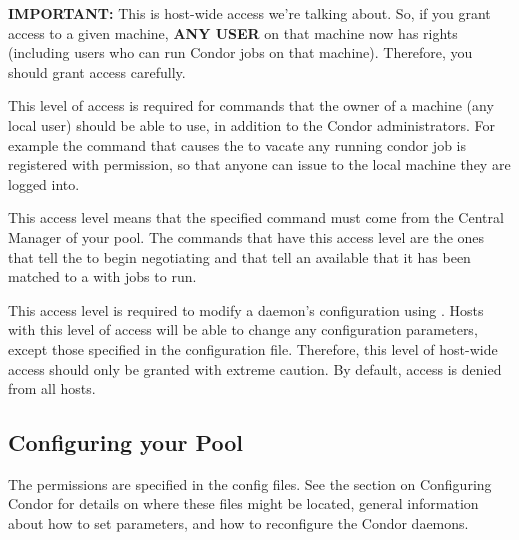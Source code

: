 \begin{description}
   \textbf{IMPORTANT:} This is host-wide access we're talking about.
   So, if you grant  access to a given machine,
   \textbf{ANY USER} on that machine now has 
   rights (including users who can run Condor jobs on that machine).
   Therefore, you should grant  access carefully.

\item[\DCPerm{OWNER}] \label{dcperm:owner} This level of access is
   required for commands that the owner of a machine (any local user)
   should be able to use, in addition to the Condor administrators.
   For example the  command that causes the
    to vacate any running condor job is registered with
    permission, so that anyone can issue 
   to the local machine they are logged into.

\item[\DCPerm{NEGOTIATOR}] \label{dcperm:negotiator} This 
   access level means that the specified command must come from the
   Central Manager of your pool.  The commands that have this access
   level are the ones that tell the  to begin
   negotiating and that tell an available  that it has
   been matched to a  with jobs to run.

\item[\DCPerm{CONFIG}] \label{dcperm:config} This access level is
   required to modify a daemon's configuration using
   .  Hosts with this level of access will be able
   to change any configuration parameters, except those specified in
   the  configuration file.  Therefore, this
   level of host-wide access should only be granted with extreme
   caution.  By default,  access is denied from all
   hosts.

\end{description}

\subsection{\label{sec:Config-DCPerms}Configuring your Pool}

The permissions are specified in the config files.  See the
section on Configuring Condor for details on where these files might
be located, general information about how to set parameters, and how
to reconfigure the Condor daemons.

